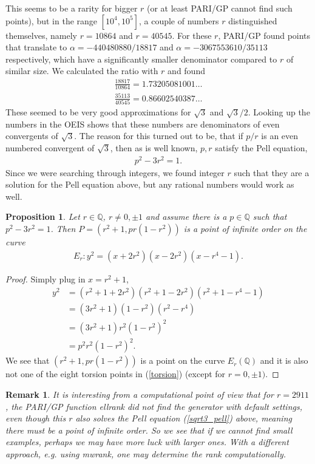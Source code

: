 \documentclass{amsart}
\newtheorem{prop}{Proposition}
\newtheorem{remark}{Remark}
\begin{document}
This seems to be a rarity for bigger $r$ (or at least PARI/GP cannot find such points), but in the range $[10^4,10^5]$, a couple of numbers $r$ distinguished themselves, namely $r = 10864$ and  $r = 40545$. For these $r$, PARI/GP found points that translate to $\alpha = -440480880/18817$ and $\alpha = -3067553610/35113$ respectively, which have a significantly smaller denominator compared to $r$ of similar size. We calculated the ratio with $r$ and found
\begin{align*}
    \frac{18817}{10864} = 1.73205081001\ldots \\
    \frac{35113}{40545} = 0.86602540387\ldots
\end{align*}
These seemed to be very good approximations for $\sqrt{3}$ and $\sqrt{3}/2$. Looking up the numbers in the OEIS shows that these numbers are denominators of even convergents of $\sqrt{3}$.
The reason for this turned out to be, that if $p/r$ is an even numbered convergent of $\sqrt{3}$, then as is well known, $p,r$ satisfy the Pell equation,
\begin{align} \label{sqrt3_pell}
    p^2-3r^2=1.
\end{align}
Since we were searching through integers, we found integer $r$ such that they are a solution for the Pell equation above, but any rational numbers would work as well. 
\begin{prop}
    Let $r\in\mathbb{Q}$, $r\neq 0, \pm 1$ and assume there is a $p\in\mathbb{Q}$ such that $p^2-3r^2=1$. Then $P=(r^2+1, pr(1-r^2))$ is a point of infinite order on the curve 
\begin{align*}
     E_r  :   y^2 = (x+2r^2)(x-2r^2)(x-r^4-1).
\end{align*}
\end{prop}
\begin{proof} Simply plug in $x=r^2+1$,
\begin{align*}
    y^2 &= (r^2+1+2r^2)(r^2+1-2r^2)(r^2+1-r^4-1) \\
    &=(3r^2+1)(1-r^2)(r^2-r^4) \\
    &=(3r^2+1)r^2(1-r^2)^2\\
    &= p^2r^2(1-r^2)^2.
\end{align*} 
We see that $(r^2+1, pr(1-r^2))$ is a point on the curve $E_r(\mathbb{Q})$ and it is also not one of the eight torsion points in (\ref{torsion}) (except for $r=0,\pm 1)$. \end{proof}

\begin{remark}
It is interesting from a computational point of view that for $r=2911$, the PARI/GP function \emph{ellrank} did not find the generator with default settings, even though this $r$ also solves the Pell equation (\ref{sqrt3_pell}) above, meaning there must be a point of infinite order. So we see that if we cannot find small examples, perhaps we may have more luck with larger ones. With a different approach, e.g. using \emph{mwrank}, one may determine the rank computationally.
\end{remark}
\end{document}
